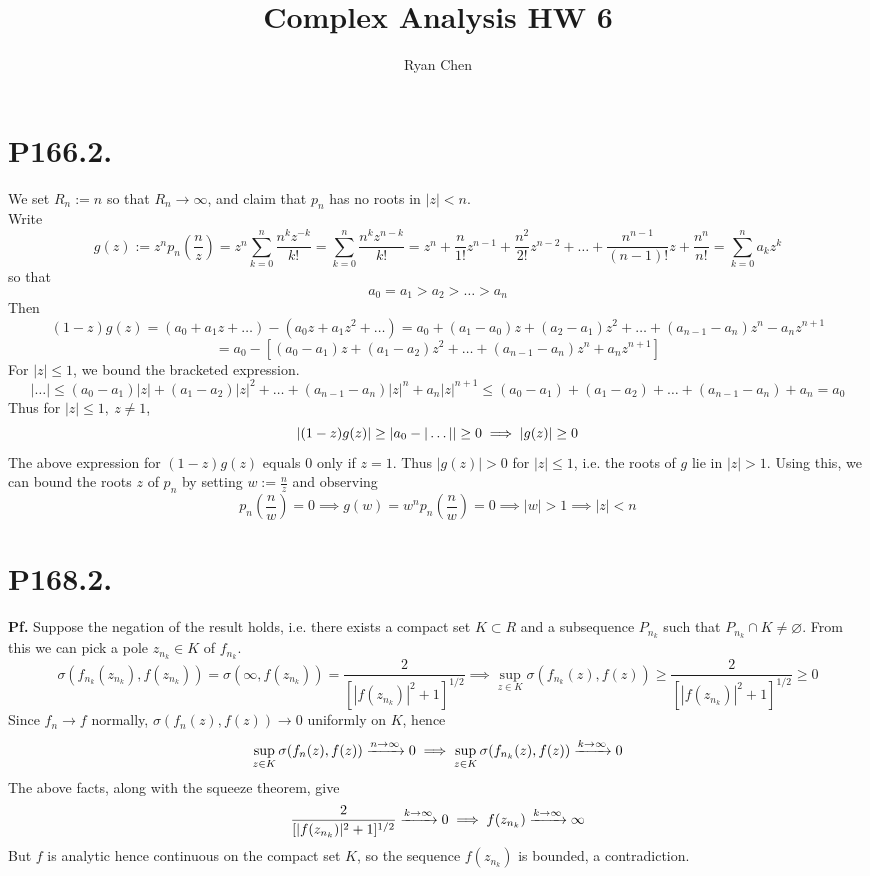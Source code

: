 \documentclass{article}
\title{Complex Analysis HW 6}
\author{Ryan Chen}
\def\tbf#1{\textbf{#1}}
\newcommand{\br}[1]{\left(#1\right)}
\newcommand{\sbr}[1]{\left[#1\right]}
\renewcommand{\ss}{\subset}
\newcommand{\vn}{\varnothing}
\newcommand{\pf}{\tbf{Pf. }}
\newcommand{\imp}{\implies}
\begin{document}
	
\maketitle



\section*{P166.2.}
We set $R_n:=n$ so that $R_n\to\infty$, and claim that $p_n$ has no roots in $|z|<n$.\\

Write
$$g(z) := z^np_n\br{\frac nz}
= z^n\sum_{k=0}^n\frac{n^kz^{-k}}{k!}
= \sum_{k=0}^n\frac{n^kz^{n-k}}{k!}
= z^n + \frac{n}{1!}z^{n-1} + \frac{n^2}{2!}z^{n-2} + \dots + \frac{n^{n-1}}{(n-1)!}z + \frac{n^n}{n!}
= \sum_{k=0}^n a_kz^k$$
so that
$$a_0 = a_1 > a_2 > \dots > a_n$$
Then
$$(1-z)g(z) = (a_0 + a_1z + \dots) - (a_0z + a_1z^2 + \dots)
= a_0 + (a_1-a_0)z + (a_2-a_1)z^2 + \dots + (a_{n-1}-a_n)z^n - a_nz^{n+1}$$
$$= a_0 - \sbr{(a_0-a_1)z + (a_1-a_2)z^2 + \dots + (a_{n-1}-a_n)z^n + a_nz^{n+1}}$$
For $|z|\le1$, we bound the bracketed expression.
$$|\dots| \le (a_0-a_1)|z| + (a_1-a_2)|z|^2 + \dots + (a_{n-1}-a_n)|z|^n + a_n|z|^{n+1}
\le (a_0-a_1) + (a_1-a_2) + \dots + (a_{n-1}-a_n) + a_n
= a_0$$
Thus for $|z|\le1,~z\ne1$,
$$|(1-z)g(z)| \ge \abs{a_0-|\dots|} \ge 0
\imp |g(z)| \ge 0$$
The above expression for $(1-z)g(z)$ equals 0 only if $z=1$. Thus $|g(z)|>0$ for $|z|\le1$, i.e. the roots of $g$ lie in $|z|>1$. Using this, we can bound the roots $z$ of $p_n$ by setting $w:=\frac nz$ and observing
$$p_n\br{\frac nw} = 0
\imp g(w) = w^np_n\br{\frac nw} = 0
\imp |w| > 1
\imp |z| < n$$



\section*{P168.2.}
\pf Suppose the negation of the result holds, i.e. there exists a compact set $K\ss R$ and a subsequence $P_{n_k}$ such that $P_{n_k}\cap K\ne\vn$. From this we can pick a pole $z_{n_k}\in K$ of $f_{n_k}$. 
$$\sigma(f_{n_k}(z_{n_k}),f(z_{n_k})) = \sigma(\infty,f(z_{n_k}))
= \frac{2}{[|f(z_{n_k})|^2+1]^{1/2}}
\imp \sup_{z\in K}\sigma(f_{n_k}(z),f(z)) \ge \frac{2}{[|f(z_{n_k})|^2+1]^{1/2}} \ge 0$$
Since $f_n\to f$ normally, $\sigma(f_n(z),f(z))\to0$ uniformly on $K$, hence
$$\sup_{z\in K}\sigma(f_n(z),f(z))\app[n]0 
\imp \sup_{z\in K}\sigma(f_{n_k}(z),f(z))\app[k]0$$
The above facts, along with the squeeze theorem, give
$$\frac{2}{[|f(z_{n_k})|^2+1]^{1/2}} \app[k] 0
\imp f(z_{n_k}) \app[k] \infty$$
But $f$ is analytic hence continuous on the compact set $K$, so the sequence $f(z_{n_k})$ is bounded, a contradiction.
\end{document}

